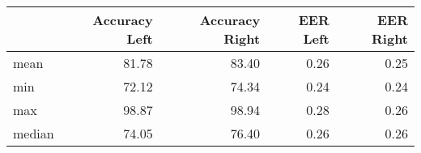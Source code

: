 \begin{tabular}{lrrrr}
\toprule
{} &  Accuracy Left &  Accuracy Right &  EER Left &  EER Right \\
\midrule
mean   &          81.78 &           83.40 &      0.26 &       0.25 \\
min    &          72.12 &           74.34 &      0.24 &       0.24 \\
max    &          98.87 &           98.94 &      0.28 &       0.26 \\
median &          74.05 &           76.40 &      0.26 &       0.26 \\
\bottomrule
\end{tabular}
